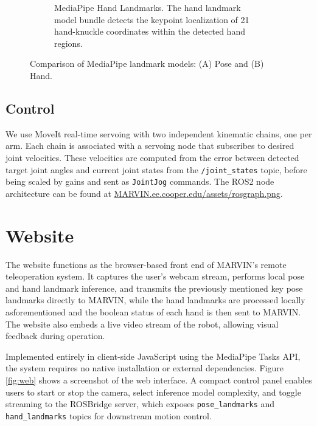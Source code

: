 \documentclass[acmsmall, screen]{acmart}
\begin{document}
\begin{figure}[htbp]
\begin{subfigure}[b]{0.35\linewidth}
    \caption{MediaPipe Hand Landmarks. The hand landmark model bundle detects the keypoint localization of 21 hand-knuckle coordinates within the detected hand regions.}
    \label{fig:hand-landmarks}
  \end{subfigure}
  \caption{Comparison of MediaPipe landmark models: (A) Pose and (B) Hand.}
  \label{fig:landmarks-comparison}
\end{figure}

\subsection{Control}
We use MoveIt real-time servoing with two independent kinematic chains, one per arm. Each chain is associated with a servoing node that subscribes to desired joint velocities. These velocities are computed from the error between detected target joint angles and current joint states from the \texttt{/joint\_states} topic, before being scaled by gains and sent as \texttt{JointJog} commands. 
The ROS2 node architecture can be found at \url{MARVIN.ee.cooper.edu/assets/rosgraph.png}.


\section{Website}
The website functions as the browser-based front end of MARVIN’s remote teleoperation system. It captures the user’s webcam stream, performs local pose and hand landmark inference, and transmits the previously mentioned key pose landmarks directly to MARVIN, while the hand landmarks are processed locally asforementioned and the boolean status of each hand is then sent to MARVIN. The website also embeds a live video stream of the robot, allowing visual feedback during operation. 

Implemented entirely in client-side JavaScript using the MediaPipe Tasks API, the system requires no native installation or external dependencies. Figure \ref{fig:web} shows a screenshot of the web interface. A compact control panel enables users to start or stop the camera, select inference model complexity, and toggle streaming to the ROSBridge server, which exposes \texttt{pose\_landmarks} and \texttt{hand\_landmarks} topics for downstream motion control.
\end{document}
